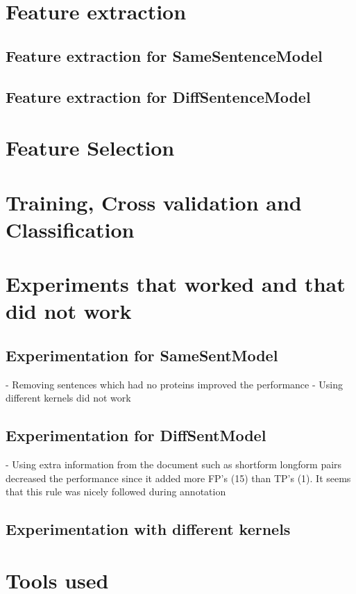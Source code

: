 \section{Feature extraction}

\subsection{Feature extraction for SameSentenceModel}

\subsection{Feature extraction for DiffSentenceModel}

\section{Feature Selection}

%
%
%

\section{Training, Cross validation and Classification}

\section{Experiments that worked and that did not work}

\subsection{Experimentation for SameSentModel}

- Removing sentences which had no proteins improved the performance
- Using different kernels did not work

\subsection{Experimentation for DiffSentModel}

- Using extra information from the document such as shortform longform pairs decreased the performance since it added more FP's (15) than TP's (1). It seems that this rule was nicely followed during annotation

\subsection{Experimentation with different kernels}

\section{Tools used}
